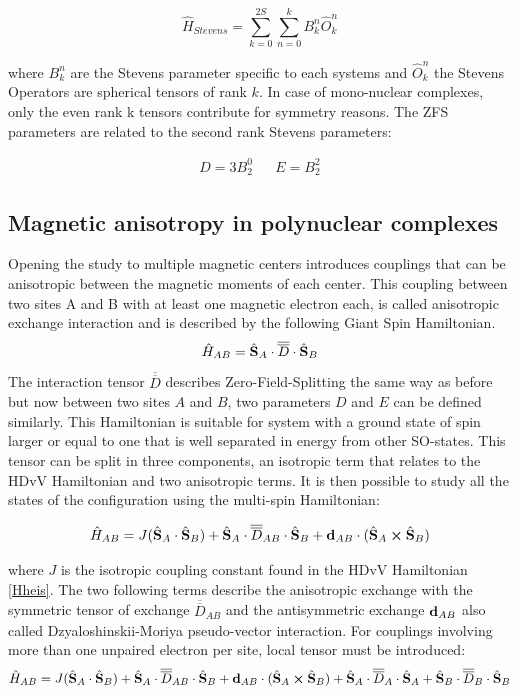 \documentclass[10pt]{report}
\numberwithin{equation}{section}
\begin{document}
\begin{equation}
    \hat{H}_{Stevens}=\sum_{k=0}^{2S}\sum_{n=0}^{k}B_k^n\hat{O}_k^n
\end{equation}

where $B_k^n$ are the Stevens parameter specific to each systems and $\hat{O}_k^n$ the Stevens Operators are spherical tensors of rank $k$.
In case of mono-nuclear complexes, only the even rank k tensors contribute for symmetry reasons. 
The ZFS parameters are related to the second rank Stevens parameters:

\begin{align}
    D=3B_2^0 && E=B_2^2
\end{align}


\subsection{Magnetic anisotropy in polynuclear complexes}
Opening the study to multiple magnetic centers introduces couplings that can be anisotropic between the magnetic moments of each center. 
This coupling between two sites A and B with at least one magnetic electron each, is called anisotropic exchange interaction and is described by the following Giant Spin Hamiltonian.
\begin{equation}
    \hat{H}_{AB}=\hat{\vb S}_A\cdot \overline{\overline{D}} \cdot \hat{\vb S}_B
\end{equation}
The interaction tensor $\overline{\overline{D}}$ describes Zero-Field-Splitting the same way as before but now between two sites $A$ and $B$, two parameters $D$ and $E$ can be defined similarly. 
This Hamiltonian is suitable for system with a ground state of spin larger or equal to one that is well separated in energy from other SO-states.
This tensor can be split in three components, an isotropic term that relates to the HDvV Hamiltonian and two anisotropic terms.
It is then possible to study all the states of the configuration using the multi-spin Hamiltonian:

\begin{equation}
    \hat{H}_{AB}=J(\hat{\vb S}_A \cdot \hat{\vb S}_B) + \hat{\vb S}_A \cdot\overline{\overline{D}}_{AB} \cdot \hat{\vb S}_B + \vb{d}_{AB} \cdot (\hat{\vb S}_A \cross \hat{\vb S}_B)
\end{equation}

\noindent where $J$ is the isotropic coupling constant found in the HDvV Hamiltonian \ref{Hheis}.
The two following terms describe the anisotropic exchange with the symmetric tensor of exchange $\overline{\overline{D}}_{AB}$ and the antisymmetric exchange $\vb{d}_{AB}$ also called Dzyaloshinskii-Moriya pseudo-vector interaction.
For couplings involving more than one unpaired electron per site, local tensor must be introduced:
\begin{equation}\label{HMS}
    \hat{H}_{AB}=J(\hat{\vb S}_A \cdot \hat{\vb S}_B) + \hat{\vb S}_A \cdot\overline{\overline{D}}_{AB} \cdot \hat{\vb S}_B + \vb{d}_{AB} \cdot (\hat{\vb S}_A \cross \hat{\vb S}_B) +\hat{\vb S}_A \cdot\overline{\overline{D}}_{A} \cdot \hat{\vb S}_A +\hat{\vb S}_B \cdot\overline{\overline{D}}_{B} \cdot \hat{\vb S}_B
\end{equation}
\end{document}
